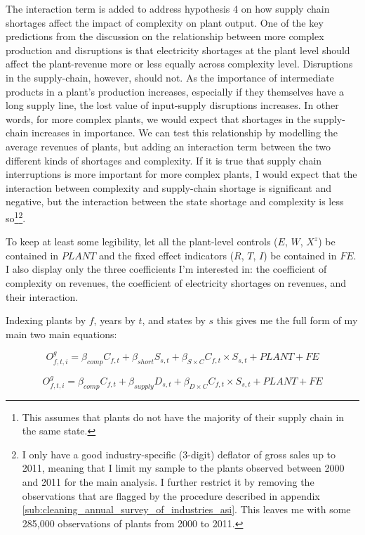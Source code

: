 \documentclass[11pt]{article}
\begin{document}
The interaction term is added to address hypothesis 4 on how supply chain shortages affect the impact of complexity on plant output. One of the key predictions from the discussion on the relationship between more complex production and disruptions is that electricity shortages at the plant level should affect the plant-revenue more or less equally across complexity level. Disruptions in the supply-chain, however, should not. As the importance of intermediate products in a plant's production increases, especially if they themselves have a long supply line, the lost value of input-supply disruptions increases. In other words, for more complex plants, we would expect that shortages in the supply-chain increases in importance. We can test this relationship by modelling the average revenues of plants, but adding an interaction term between the two different kinds of shortages and complexity. If it is true that supply chain interruptions is more important for more complex plants, I would expect that the interaction between complexity and supply-chain shortage is significant and negative, but the interaction between the state shortage and complexity is less so\footnote{This assumes that plants do not have the majority of their supply chain in the same state.}\footnote{I only have a good industry-specific (3-digit) deflator of gross sales up to 2011, meaning that I limit my sample to the plants observed between 2000 and 2011 for the main analysis. I further restrict it by removing the observations that are flagged by the procedure described in appendix \ref{sub:cleaning_annual_survey_of_industries_asi}. This leaves me with some 285,000 observations of plants from 2000 to 2011.}.

To keep at least some legibility, let all the plant-level controls ($E$, $W$, $X^{z}$) be contained in $PLANT$ and the fixed effect indicators ($R$, $T$, $I$) be contained in $FE$. I also display only the three coefficients I'm interested in: the coefficient of complexity on revenues, the coefficient of electricity shortages on revenues, and their interaction.

Indexing plants by $f$, years by $t$, and states by $s$ this gives me the full form of my main two main equations:

\begin{equation}
\label{eqn:int_shortages}
O^{g}_{f,t,i} = \beta_{comp} C_{f,t} + \beta_{short} S_{s,t} + \beta_{S\times C} C_{f,t} \times S_{s,t} + PLANT + FE
\end{equation}

\begin{equation}
\label{eqn:int_supply}
O^{g}_{f,t,i} = \beta_{comp} C_{f,t} + \beta_{supply} D_{s,t} + \beta_{D\times C} C_{f,t} \times S_{s,t} + PLANT + FE
\end{equation}
\end{document}

